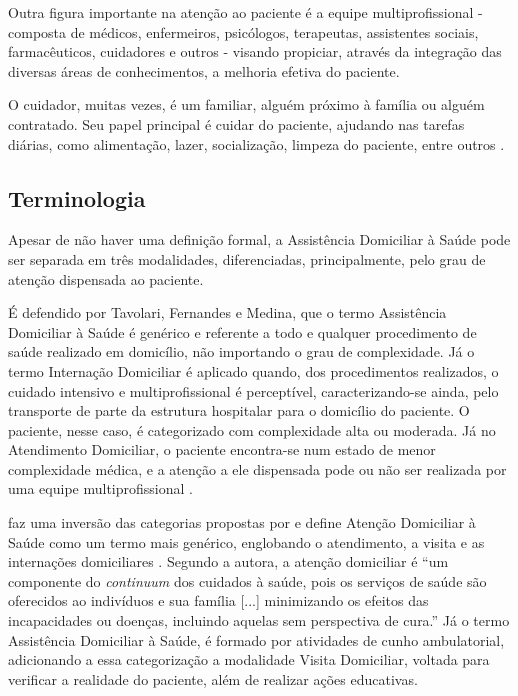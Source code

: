 Outra figura importante na atenção ao paciente é a equipe multiprofissional -
composta de médicos, enfermeiros, psicólogos, terapeutas, assistentes sociais,
farmacêuticos, cuidadores e outros - visando propiciar, através da integração
das diversas áreas de conhecimentos, a melhoria efetiva do paciente.

O cuidador, muitas vezes, é um familiar, alguém próximo à família ou alguém
contratado. Seu papel principal é cuidar do paciente, ajudando nas tarefas
diárias, como alimentação, lazer, socialização, limpeza do paciente, entre
outros \cite{amaral2001assistencia}.


\subsection{Terminologia}\label{subsec:terminologia}

Apesar de não haver uma definição formal, a Assistência Domiciliar à Saúde pode
ser separada em três modalidades, diferenciadas, principalmente, pelo grau de 
atenção dispensada ao paciente. 

É defendido por Tavolari, Fernandes e Medina, que o termo Assistência Domiciliar
à Saúde é genérico e referente a todo e qualquer procedimento de saúde realizado
em domicílio, não importando o grau de complexidade. Já o termo Internação
Domiciliar é aplicado quando, dos procedimentos realizados, o cuidado intensivo
e multiprofissional é perceptível, caracterizando-se ainda, pelo transporte de
parte da estrutura hospitalar para o domicílio do paciente. O paciente, nesse
caso, é categorizado com complexidade alta ou moderada.
Já no Atendimento Domiciliar, o paciente encontra-se num estado de menor 
complexidade médica, e a atenção a ele dispensada pode ou não ser realizada por
uma equipe multiprofissional \cite{tavolari2000desenvolvimento}.


 faz uma inversão das categorias propostas
por  e  define Atenção Domiciliar à
Saúde como um termo mais genérico, englobando o atendimento, a visita e as
internações domiciliares \cite{giacomozzi2006pratica}. Segundo a autora, a
atenção domiciliar é ``um componente do \textit{continuum} dos cuidados à
saúde, pois os serviços de saúde são oferecidos ao indivíduos e sua família
[...] minimizando os efeitos das incapacidades ou doenças, incluindo aquelas
sem perspectiva de cura.'' Já o termo Assistência Domiciliar à Saúde, é formado
por atividades de cunho ambulatorial, adicionando a essa categorização a
modalidade Visita Domiciliar, voltada para verificar a realidade do paciente,
além de realizar ações educativas.

